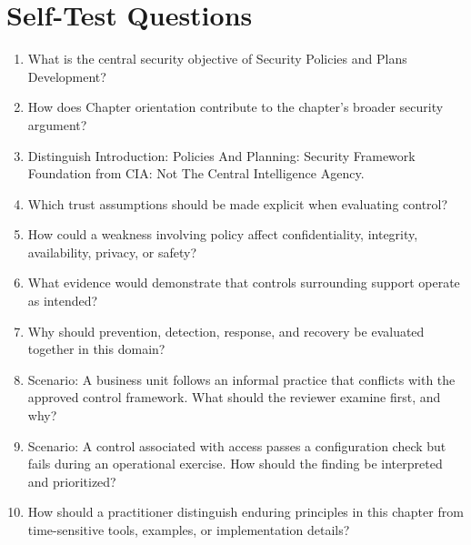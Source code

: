 \documentclass[11pt]{article}
\begin{document}
\section*{Self-Test Questions}
\begin{enumerate}
\item What is the central security objective of Security Policies and Plans Development?
\item How does Chapter orientation contribute to the chapter's broader security argument?
\item Distinguish Introduction: Policies And Planning: Security Framework Foundation from CIA: Not The Central Intelligence Agency.
\item Which trust assumptions should be made explicit when evaluating control?
\item How could a weakness involving policy affect confidentiality, integrity, availability, privacy, or safety?
\item What evidence would demonstrate that controls surrounding support operate as intended?
\item Why should prevention, detection, response, and recovery be evaluated together in this domain?
\item Scenario: A business unit follows an informal practice that conflicts with the approved control framework. What should the reviewer examine first, and why?
\item Scenario: A control associated with access passes a configuration check but fails during an operational exercise. How should the finding be interpreted and prioritized?
\item How should a practitioner distinguish enduring principles in this chapter from time-sensitive tools, examples, or implementation details?
\end{enumerate}
\end{document}
